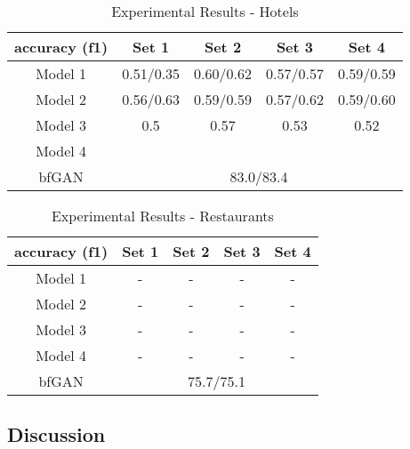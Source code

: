 \documentclass[conference]{IEEEtran} %
\theoremstyle{plain}
\theoremstyle{definition}
\begin{document}
\begin{table}[h]
\normalsize
\caption{Experimental Results - Hotels}
\centering
\begin{tabular}{|c|c|c|c|c|}
\hline
 accuracy (f1) & Set 1 & Set 2 & Set 3 & Set 4 \\ \hline
 
Model 1 & 0.51/0.35 & 0.60/0.62 & 0.57/0.57 & 0.59/0.59 \\ \hline
Model 2 & 0.56/0.63 & 0.59/0.59 & 0.57/0.62 & 0.59/0.60 \\ \hline
Model 3 & 0.5 & 0.57 & 0.53 & 0.52  \\ \hline
Model 4 &  &  & & \\ \hline
bfGAN\cite{Tang2020} & \multicolumn{4}{c|}{83.0/83.4} \\
\hline
\end{tabular}
\label{exp-hotels}
\end{table}

\begin{table}[h]
\normalsize
\caption{Experimental Results - Restaurants}
\centering
\begin{tabular}{|c|c|c|c|c|}
\hline
 accuracy (f1) & Set 1 & Set 2 & Set 3 & Set 4 \\ \hline
Model 1 & - & - & - & - \\ \hline
Model 2 & - & - & - & - \\ \hline
Model 3 & - & - & - & - \\ \hline
Model 4 & - & - & - & - \\ \hline
bfGAN\cite{Tang2020}& \multicolumn{4}{c|}{75.7/75.1} \\
\hline
\end{tabular}
\label{exp-restaurants}

\end{table}

\subsection{Discussion}
\end{document}
